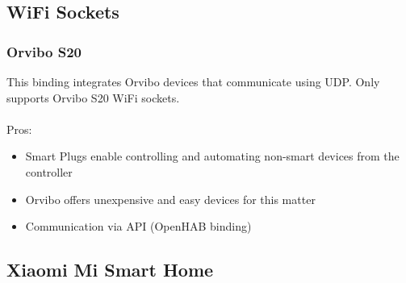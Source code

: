 \subsection{WiFi Sockets}

\subsubsection{Orvibo S20}
This binding integrates Orvibo devices that communicate using UDP. Only supports Orvibo S20 WiFi sockets.\\~\\
Pros:
\begin{itemize}
	\item Smart Plugs enable controlling and automating non-smart devices from the controller
	\item Orvibo offers unexpensive and easy devices for this matter
	\item Communication via API (OpenHAB binding)
\end{itemize}

\subsection{Xiaomi Mi Smart Home}

